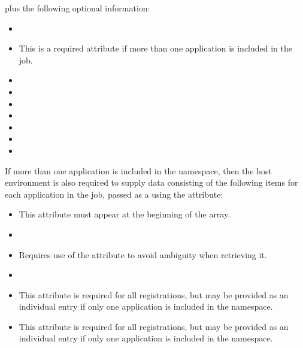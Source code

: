 plus the following optional information:

\begin{itemize}
    \item {}
    \item {}This is a required attribute if more than one application is included in the job.
    \pasteAttributeItemEnd
    \item {}
    \item {}
    \item {}
    \item {}
    \item {}
    \item {}
    \item {}
\end{itemize}

If more than one application is included in the namespace, then the host environment is also required to supply data consisting of the following items for each application in the job, passed as a  using the  attribute:

\begin{itemize}
    \item {}This attribute must appear at the beginning of the array.
    \pasteAttributeItemEnd
    \item {}
    \item {}Requires use of the  attribute to avoid ambiguity when retrieving it.
    \pasteAttributeItemEnd
    \item {}
    \item {}This attribute is required for all registrations, but may be provided as an individual  entry if only one application is included in the namespace.
    \pasteAttributeItemEnd
    \item {}This attribute is required for all registrations, but may be provided as an individual  entry if only one application is included in the namespace.
    \pasteAttributeItemEnd
\end{itemize}

